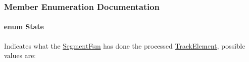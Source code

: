 \subsubsection{Member Enumeration Documentation}
\hypertarget{classKite_1_1SegmentFsm_a5d74787dedbc4e11c1ab15bf487e61f8}{
\paragraph[{State}]{\setlength{\rightskip}{0pt plus 5cm}enum {\bf State}}}\label{classKite_1_1SegmentFsm_a5d74787dedbc4e11c1ab15bf487e61f8}
Indicates what the \hyperlink{classKite_1_1SegmentFsm}{Segment\-Fsm} has done the processed \hyperlink{classKite_1_1TrackElement}{Track\-Element}, possible values are\-:
